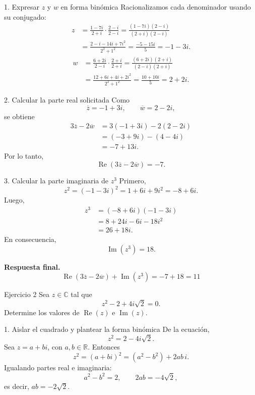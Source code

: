 \documentclass[letterpaper,11pt]{article}
\newcommand{\R}{\operatorname{Re}}
\newcommand{\Ima}{\operatorname{Im}}
\begin{document}
\begin{desarrollo}{1. Expresar \(z\) y \(w\) en forma binómica}
Racionalizamos cada denominador usando su conjugado:
\[
\begin{aligned}
z
&=\frac{1-7i}{2+i}\cdot\frac{2-i}{2-i}
 =\frac{(1-7i)(2-i)}{(2+i)(2-i)}\\
&=\frac{2-i-14i+7i^2}{2^2+1^2}
 =\frac{-5-15i}{5}
 =-1-3i.
\end{aligned}
\]
\[
\begin{aligned}
w
&=\frac{6+2i}{2-i}\cdot\frac{2+i}{2+i}
 =\frac{(6+2i)(2+i)}{(2-i)(2+i)}\\
&=\frac{12+6i+4i+2i^2}{2^2+1^2}
 =\frac{10+10i}{5}
 =2+2i.
\end{aligned}
\]
\end{desarrollo}

\begin{desarrollo}{2. Calcular la parte real solicitada}
Como
\[
\overline z=-1+3i,
\qquad
\overline w=2-2i,
\]
se obtiene
\[
\begin{aligned}
3\overline z-2\overline w
&=3(-1+3i)-2(2-2i)\\
&=(-3+9i)-(4-4i)\\
&=-7+13i.
\end{aligned}
\]
Por lo tanto,
\[
\R\!\left(3\overline z-2\overline w\right)=-7.
\]
\end{desarrollo}

\begin{desarrollo}{3. Calcular la parte imaginaria de \(z^3\)}
Primero,
\[
z^2=(-1-3i)^2=1+6i+9i^2=-8+6i.
\]
Luego,
\[
\begin{aligned}
z^3
&=(-8+6i)(-1-3i)\\
&=8+24i-6i-18i^2\\
&=26+18i.
\end{aligned}
\]
En consecuencia,
\[
\Ima(z^3)=18.
\]
\end{desarrollo}

\begin{respuesta}
\textbf{Respuesta final.}
\[
\boxed{\R\!\left(3\overline z-2\overline w\right)+\Ima(z^3)
=-7+18=11}
\]
\end{respuesta}

\newpage

\begin{enunciado}{Ejercicio 2}
Sea \(z\in\mathbb{C}\) tal que
\[
z^2-2+4i\sqrt2=0.
\]
Determine los valores de \(\R(z)\) e \(\Ima(z)\).
\end{enunciado}

\begin{desarrollo}{1. Aislar el cuadrado y plantear la forma binómica}
De la ecuación,
\[
z^2=2-4i\sqrt2.
\]
Sea \(z=a+bi\), con \(a,b\in\mathbb{R}\). Entonces
\[
z^2=(a+bi)^2=(a^2-b^2)+2ab\,i.
\]
Igualando partes real e imaginaria:
\[
\boxed{a^2-b^2=2},
\qquad
\boxed{2ab=-4\sqrt2},
\]
es decir, \(ab=-2\sqrt2\).
\end{desarrollo}
\end{document}
